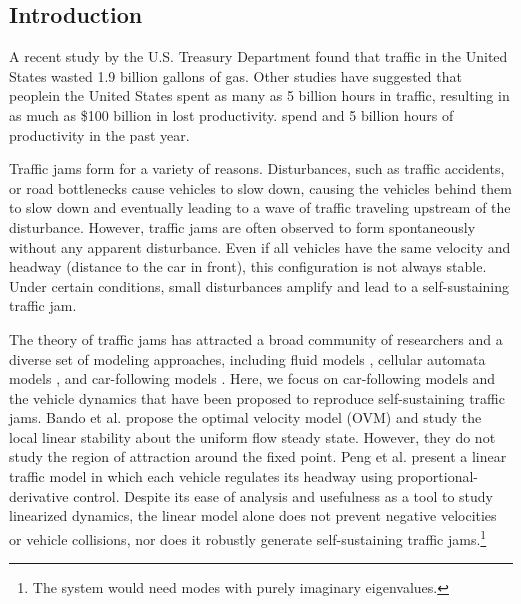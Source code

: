 \documentclass[10pt]{article}
\begin{document}
\begin{multicols}{2}


\section{Introduction}
A recent study by the U.S. Treasury Department found that traffic in the United States wasted 1.9 billion gallons of gas. Other studies have suggested that peoplein the United States spent as many as 5 billion hours in traffic, resulting in as much as \$100 billion in lost productivity.  spend and 5 billion hours of productivity in the past year.

Traffic jams form for a variety of reasons. Disturbances, such as traffic accidents, or road bottlenecks cause vehicles to slow down, causing the vehicles behind them to slow down and eventually leading to a wave of traffic traveling upstream of the disturbance. However, traffic jams are often observed to form spontaneously without any apparent disturbance. Even if all vehicles have the same velocity and headway (distance to the car in front), this configuration is not always stable. Under certain conditions, small disturbances amplify and lead to a self-sustaining traffic jam.

The theory of traffic jams has attracted a broad community of researchers and a diverse set of modeling approaches, including fluid models \cite{}, cellular automata models \cite{}, and car-following models \cite{}. Here, we focus on car-following models and the vehicle dynamics that have been proposed to reproduce self-sustaining traffic jams. Bando et al. \cite{Bando} propose the optimal velocity model (OVM) and study the local linear stability about the uniform flow steady state. However, they do not study the region of attraction around the fixed point. Peng et al. \cite{Peng} present a linear traffic model in which each vehicle regulates its headway using proportional-derivative control. Despite its ease of analysis and usefulness as a tool to study linearized dynamics, the linear model alone does not prevent negative velocities or vehicle collisions, nor does it robustly generate self-sustaining traffic jams.\footnote{The system would need modes with purely imaginary eigenvalues.}


\end{multicols}
\end{document}
